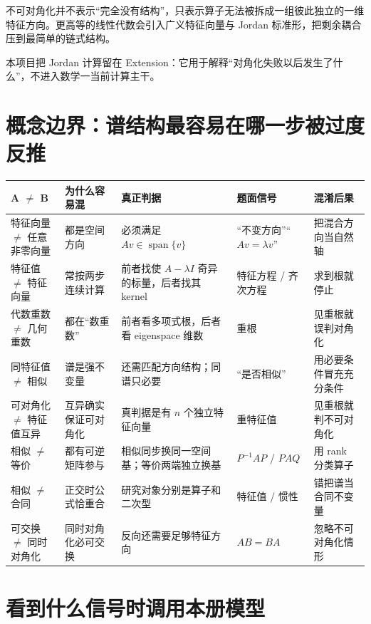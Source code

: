 \documentclass[11pt,a4paper]{ctexart}
\begin{document}
不可对角化并不表示“完全没有结构”，只表示算子无法被拆成一组彼此独立的一维特征方向。更高等的线性代数会引入广义特征向量与 Jordan 标准形，把剩余耦合压到最简单的链式结构。

本项目把 Jordan 计算留在 Extension：它用于解释“对角化失败以后发生了什么”，不进入数学一当前计算主干。

\section{概念边界：谱结构最容易在哪一步被过度反推}

\begin{longtable}{L{2.5cm}L{3.0cm}L{3.8cm}L{3.2cm}L{\dimexpr\linewidth-13.1cm\relax}}
\toprule
\textbf{A $\neq$ B} & \textbf{为什么容易混} & \textbf{真正判据} & \textbf{题面信号} & \textbf{混淆后果}\\
\midrule
特征向量 $\neq$ 任意非零向量 & 都是空间方向 & 必须满足 $Av\in\operatorname{span}\{v\}$ & “不变方向”“$Av=\lambda v$” & 把混合方向当自然轴\\
特征值 $\neq$ 特征向量 & 常按两步连续计算 & 前者找使 $A-\lambda I$ 奇异的标量，后者找其 kernel & 特征方程 / 齐次方程 & 求到根就停止\\
代数重数 $\neq$ 几何重数 & 都在“数重数” & 前者看多项式根，后者看 eigenspace 维数 & 重根 & 见重根就误判对角化\\
同特征值 $\neq$ 相似 & 谱是强不变量 & 还需匹配方向结构；同谱只必要 & “是否相似” & 用必要条件冒充充分条件\\
可对角化 $\neq$ 特征值互异 & 互异确实保证可对角化 & 真判据是有 $n$ 个独立特征向量 & 重特征值 & 见重根就判不可对角化\\
相似 $\neq$ 等价 & 都有可逆矩阵参与 & 相似同步换同一空间基；等价两端独立换基 & $P^{-1}AP$ / $PAQ$ & 用 rank 分类算子\\
相似 $\neq$ 合同 & 正交时公式恰重合 & 研究对象分别是算子和二次型 & 特征值 / 惯性 & 错把谱当合同不变量\\
可交换 $\neq$ 同时对角化 & 同时对角化必可交换 & 反向还需要足够特征方向 & $AB=BA$ & 忽略不可对角化情形\\
\bottomrule
\end{longtable}

\section{看到什么信号时调用本册模型}
\end{document}
